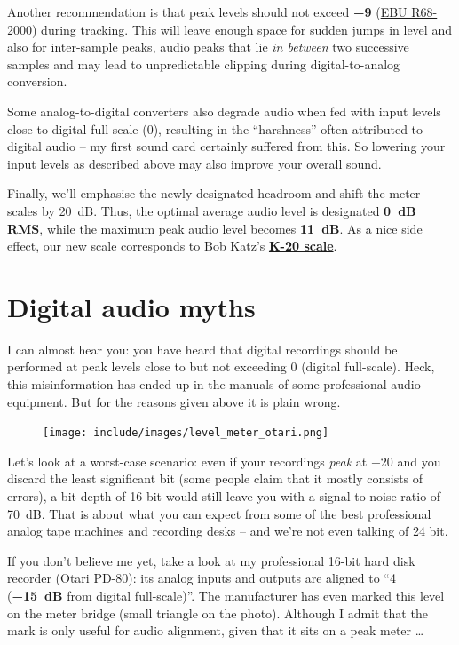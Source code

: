 Another recommendation is that peak levels should not exceed
\textbf{\SI{-9}{\dBFS}}
(\href{http://tech.ebu.ch/publications/r068}{EBU R68-2000}) during
tracking.  This will leave enough space for sudden jumps in level and
also for inter-sample peaks, audio peaks that lie \emph{in between}
two successive samples and may lead to unpredictable clipping during
digital-to-analog conversion.

Some analog-to-digital converters also degrade audio when fed with
input levels close to digital full-scale (\SI{0}{\dBFS}), resulting in
the ``harshness'' often attributed to digital audio -- my first sound
card certainly suffered from this.  So lowering your input levels as
described above may also improve your overall sound.

Finally, we'll emphasise the newly designated headroom and shift the
meter scales by \SI[addsign=all]{+20}{\dB}.  Thus, the optimal average
audio level is designated \textbf{\SI{0}{\dB} RMS}, while the maximum
peak audio level becomes \textbf{\SI[addsign=all]{+11}{\dB}}.  As a
nice side effect, our new scale corresponds to Bob Katz's
\textbf{\href{http://www.digido.com/level-practices-part-2-includes-the-k-system.html}{K-20
    scale}}.

\section{Digital audio myths}
\label{sec:digital_audio_myths}

I can almost hear you: you have heard that digital recordings should
be performed at peak levels close to but not exceeding \SI{0}{\dBFS}
(digital full-scale).  Heck, this misinformation has ended up in the
manuals of some professional audio equipment.  But for the reasons
given above it is plain wrong.

\begin{figure}
  \texttt{[image: include/images/level\_meter\_otari.png]}
\end{figure}

Let's look at a worst-case scenario: even if your recordings
\emph{peak} at \SI{-20}{\dBFS} and you discard the least significant
bit (some people claim that it mostly consists of errors), a bit depth
of 16 bit would still leave you with a signal-to-noise ratio of
\SI{70}{\dB}.  That is about what you can expect from some of the best
professional analog tape machines and recording desks -- and we're not
even talking of 24 bit.

If you don't believe me yet, take a look at my professional 16-bit
hard disk recorder (Otari PD-80): its analog inputs and outputs are
aligned to ``\SI[addsign=all]{+4}{\dBu} (\textbf{\SI{-15}{\dB}} from
digital full-scale)''.  The manufacturer has even marked this level on
the meter bridge (small triangle on the photo).  Although I admit that
the mark is only useful for audio alignment, given that it sits on a
peak meter \dots


